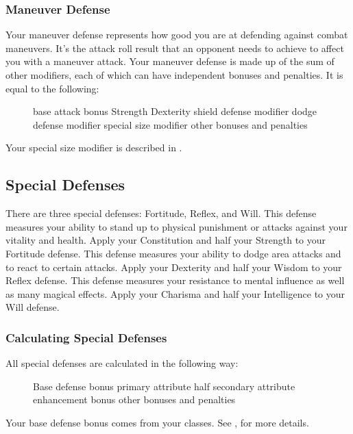 \subsubsection{Maneuver Defense}
Your maneuver defense represents how good you are at defending against combat maneuvers. It's the attack roll result that an opponent needs to achieve to affect you with a maneuver attack. Your maneuver defense is made up of the sum of other modifiers, each of which can have independent bonuses and penalties. It is equal to the following:

\begin{figure}[h]
     \add base attack bonus \add Strength \add Dexterity \add shield defense modifier \add dodge defense modifier \add special size modifier \add other bonuses and penalties
\end{figure}

Your special size modifier is described in .

\subsection{Special Defenses}
There are three special defenses: Fortitude, Reflex, and Will.
 This defense measures your ability to stand up to physical punishment or attacks against your vitality and health. Apply your Constitution and half your Strength to your Fortitude defense.
 This defense measures your ability to dodge area attacks and to react to certain attacks. Apply your Dexterity and half your Wisdom to your Reflex defense.
 This defense measures your resistance to mental influence as well as many magical effects. Apply your Charisma and half your Intelligence to your Will defense.

\subsubsection{Calculating Special Defenses}
All special defenses are calculated in the following way:

\begin{figure}[h]
\centering Base defense bonus \add primary attribute \add half secondary attribute \add enhancement bonus \add other bonuses and penalties
\end{figure}

Your base defense bonus comes from your classes. See , for more details.


